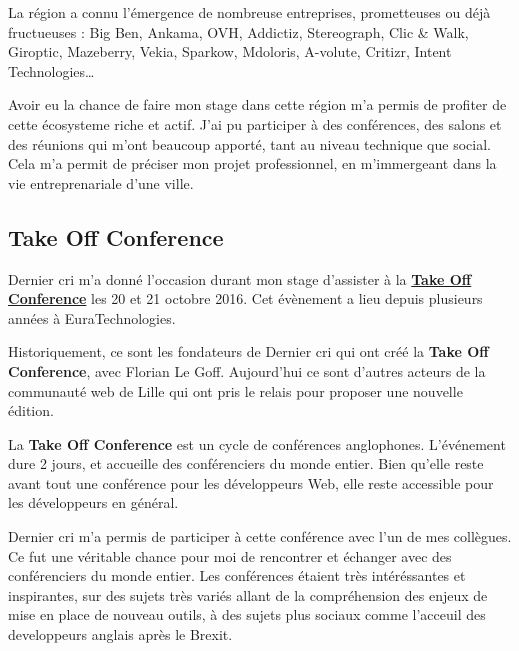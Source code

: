 \documentclass[12pt,a4paper]{article}
\begin{document}
  \bigskip

  La région a connu l'émergence de nombreuse entreprises, prometteuses ou
  déjà fructueuses : Big Ben, Ankama, OVH, Addictiz, Stereograph, Clic \&
  Walk, Giroptic, Mazeberry, Vekia, Sparkow, Mdoloris, A-volute, Critizr,
  Intent Technologies\ldots{}

  \bigskip

  Avoir eu la chance de faire mon stage dans cette région m'a permis de
  profiter de cette écosysteme riche et actif. J'ai pu participer à des
  conférences, des salons et des réunions qui m'ont beaucoup apporté, tant
  au niveau technique que social. Cela m'a permit de préciser mon projet
  professionnel, en m'immergeant dans la vie entreprenariale d'une ville.

  \bigskip

  \subsection{Take Off Conference}\label{take-off-conference}

  \bigskip

  Dernier cri m'a donné l'occasion durant mon stage d'assister à la
  \href{http://takeoffconf.com/2016}{\textbf{Take Off Conference}} les 20
  et 21 octobre 2016. Cet évènement a lieu depuis plusieurs années à
  EuraTechnologies.

  \bigskip

  Historiquement, ce sont les fondateurs de Dernier cri qui ont créé la
  \textbf{Take Off Conference}, avec Florian Le Goff. Aujourd'hui ce sont
  d'autres acteurs de la communauté web de Lille qui ont pris le relais
  pour proposer une nouvelle édition.

  \bigskip

  La \textbf{Take Off Conference} est un cycle de conférences anglophones.
  L'événement dure 2 jours, et accueille des conférenciers du monde
  entier. Bien qu'elle reste avant tout une conférence pour les
  développeurs Web, elle reste accessible pour les développeurs en
  général.

  \bigskip

  Dernier cri m'a permis de participer à cette conférence avec l'un de mes
  collègues. Ce fut une véritable chance pour moi de rencontrer et
  échanger avec des conférenciers du monde entier. Les conférences étaient
  très intéréssantes et inspirantes, sur des sujets très variés allant de
  la compréhension des enjeux de mise en place de nouveau outils, à des
  sujets plus sociaux comme l'acceuil des developpeurs anglais après le
  Brexit.
\end{document}
